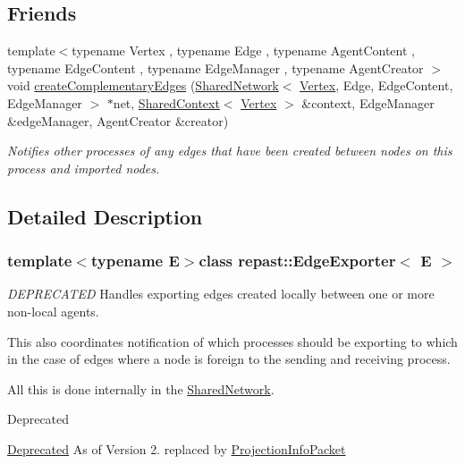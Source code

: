 \subsection*{Friends}
\begin{DoxyCompactItemize}
\item 
{\footnotesize template$<$typename Vertex , typename Edge , typename Agent\-Content , typename Edge\-Content , typename Edge\-Manager , typename Agent\-Creator $>$ }\\void \hyperlink{classrepast_1_1_edge_exporter_aab38d29bc953ebb66d39ecb27f392acf}{create\-Complementary\-Edges} (\hyperlink{classrepast_1_1_shared_network}{Shared\-Network}$<$ \hyperlink{classrepast_1_1_vertex}{Vertex}, Edge, Edge\-Content, Edge\-Manager $>$ $\ast$net, \hyperlink{classrepast_1_1_shared_context}{Shared\-Context}$<$ \hyperlink{classrepast_1_1_vertex}{Vertex} $>$ \&context, Edge\-Manager \&edge\-Manager, Agent\-Creator \&creator)
\begin{DoxyCompactList}\small\item\em Notifies other processes of any edges that have been created between nodes on this process and imported nodes. \end{DoxyCompactList}\end{DoxyCompactItemize}


\subsection{Detailed Description}
\subsubsection*{template$<$typename E$>$class repast\-::\-Edge\-Exporter$<$ E $>$}

{\itshape D\-E\-P\-R\-E\-C\-A\-T\-E\-D} Handles exporting edges created locally between one or more non-\/local agents. 

This also coordinates notification of which processes should be exporting to which in the case of edges where a node is foreign to the sending and receiving process.

All this is done internally in the \hyperlink{classrepast_1_1_shared_network}{Shared\-Network}.

\begin{DoxyRefDesc}{Deprecated}
\item[\hyperlink{deprecated__deprecated000005}{Deprecated}]As of Version 2. replaced by \hyperlink{classrepast_1_1_projection_info_packet}{Projection\-Info\-Packet} \end{DoxyRefDesc}



